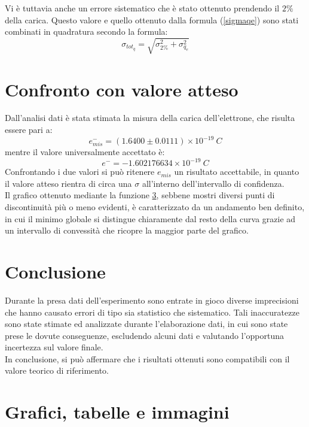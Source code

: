 \documentclass{article}
\begin{document}
Vi è tuttavia anche un errore sistematico che è stato ottenuto prendendo il $2\%$ della carica. Questo valore e quello ottenuto dalla formula (\ref{sigmaqe}) sono stati combinati in quadratura secondo la formula:
\begin{equation}
	\sigma_{tot_q}=\sqrt{\sigma_{2\%}^2+\sigma_{q_e}^2}
\end{equation}

\section{Confronto con valore atteso}
Dall'analisi dati è stata stimata la misura della carica dell'elettrone, che risulta essere pari a: \[e^{-}_{mis}=(1.6400 \pm 0.0111)\times 10^{-19} \ C\] mentre il valore universalmente accettato è: \[e^{-} = -1.602176634 \times 10^{-19} \ C\]
Confrontando i due valori si può ritenere \textit{$e_{mis}$} un risultato accettabile, in quanto il valore atteso rientra di circa una $\sigma$  all'interno dell'intervallo di confidenza.\\
Il grafico ottenuto mediante la funzione \ref{}, sebbene mostri diversi punti di discontinuità più o meno evidenti, è caratterizzato da un andamento ben definito, in cui il minimo globale si distingue chiaramente dal resto della curva grazie ad un intervallo di convessità che ricopre la maggior parte del grafico.

\section{Conclusione}
Durante la presa dati dell'esperimento sono entrate in gioco diverse imprecisioni che hanno causato errori di tipo sia statistico che sistematico. Tali inaccuratezze sono state stimate ed analizzate durante l'elaborazione dati, in cui sono state prese le dovute conseguenze, escludendo alcuni dati e valutando l'opportuna incertezza sul valore finale.\\
In conclusione, si può affermare che i risultati ottenuti sono compatibili con il valore teorico di riferimento.

\section{Grafici, tabelle e immagini}
\end{document}
